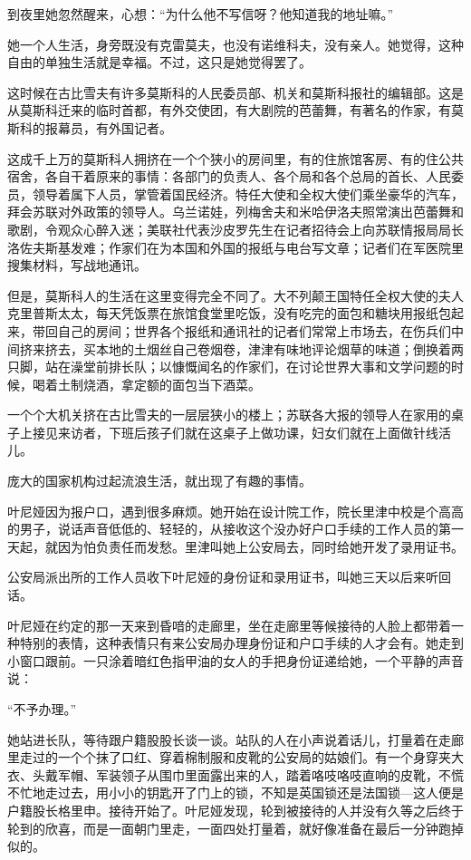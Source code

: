 到夜里她忽然醒来，心想：“为什么他不写信呀？他知道我的地址嘛。”

她一个人生活，身旁既没有克雷莫夫，也没有诺维科夫，没有亲人。她觉得，这种自由的单独生活就是幸福。不过，这只是她觉得罢了。

这时候在古比雪夫有许多莫斯科的人民委员部、机关和莫斯科报社的编辑部。这是从莫斯科迁来的临时首都，有外交使团，有大剧院的芭蕾舞，有著名的作家，有莫斯科的报幕员，有外国记者。

这成千上万的莫斯科人拥挤在一个个狭小的房间里，有的住旅馆客房、有的住公共宿舍，各自干着原来的事情：各部门的负责人、各个局和各个总局的首长、人民委员，领导着属下人员，掌管着国民经济。特任大使和全权大使们乘坐豪华的汽车，拜会苏联对外政策的领导人。乌兰诺娃，列梅舍夫和米哈伊洛夫照常演出芭蕾舞和歌剧，令观众心醉入迷；美联社代表沙皮罗先生在记者招待会上向苏联情报局局长洛佐夫斯基发难；作家们在为本国和外国的报纸与电台写文章；记者们在军医院里搜集材料，写战地通讯。

但是，莫斯科人的生活在这里变得完全不同了。大不列颠王国特任全权大使的夫人克里普斯太太，每天凭饭票在旅馆食堂里吃饭，没有吃完的面包和糖块用报纸包起来，带回自己的房间；世界各个报纸和通讯社的记者们常常上市场去，在伤兵们中间挤来挤去，买本地的土烟丝自己卷烟卷，津津有味地评论烟草的味道；倒换着两只脚，站在澡堂前排长队；以慷慨闻名的作家们，在讨论世界大事和文学问题的时候，喝着土制烧酒，拿定额的面包当下酒菜。

一个个大机关挤在古比雪夫的一层层狭小的楼上；苏联各大报的领导人在家用的桌子上接见来访者，下班后孩子们就在这桌子上做功课，妇女们就在上面做针线活儿。

庞大的国家机构过起流浪生活，就出现了有趣的事情。

叶尼娅因为报户口，遇到很多麻烦。她开始在设计院工作，院长里津中校是个高高的男子，说话声音低低的、轻轻的，从接收这个没办好户口手续的工作人员的第一天起，就因为怕负责任而发愁。里津叫她上公安局去，同时给她开发了录用证书。

公安局派出所的工作人员收下叶尼娅的身份证和录用证书，叫她三天以后来听回话。

叶尼娅在约定的那一天来到昏喑的走廊里，坐在走廊里等候接待的人脸上都带着一种特别的表情，这种表情只有来公安局办理身份证和户口手续的人才会有。她走到小窗口跟前。一只涂着暗红色指甲油的女人的手把身份证递给她，一个平静的声音说：

“不予办理。”

她站进长队，等待跟户籍股股长谈一谈。站队的人在小声说着话儿，打量着在走廊里走过的一个个抹了口红、穿着棉制服和皮靴的公安局的姑娘们。有一个身穿夹大衣、头戴军帽、军装领子从围巾里面露出来的人，踏着咯吱咯吱直响的皮靴，不慌不忙地走过去，用小小的钥匙开了门上的锁，不知是英国锁还是法国锁—这人便是户籍股长格里申。接待开始了。叶尼娅发现，轮到被接待的人并没有久等之后终于轮到的欣喜，而是一面朝门里走，一面四处打量着，就好像准备在最后一分钟跑掉似的。

